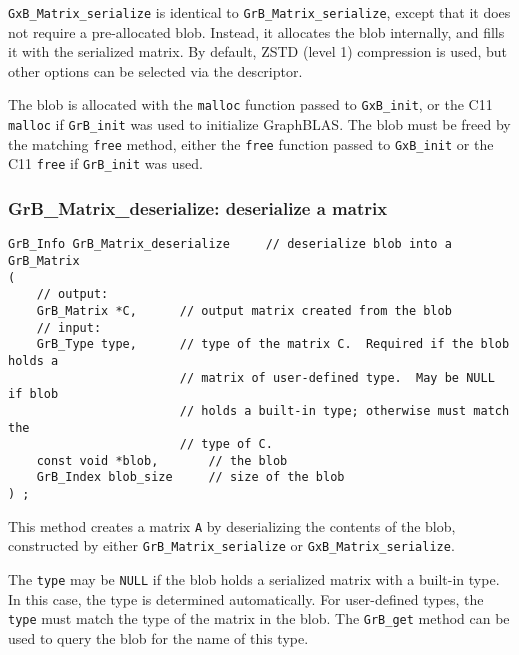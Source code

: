 \documentclass[12pt]{article}
\begin{document}
\verb'GxB_Matrix_serialize' is identical to \verb'GrB_Matrix_serialize', except
that it does not require a pre-allocated blob.  Instead, it allocates the blob
internally, and fills it with the serialized matrix.  By default, ZSTD (level 1)
compression is used, but other options can be selected via the descriptor.

The blob is allocated with the \verb'malloc' function passed to
\verb'GxB_init', or the C11 \verb'malloc' if \verb'GrB_init' was used
to initialize GraphBLAS.  The blob must be freed by the matching \verb'free'
method, either the \verb'free' function passed to \verb'GxB_init' or
the C11 \verb'free' if \verb'GrB_init' was used.

\newpage
\subsubsection{{\sf GrB\_Matrix\_deserialize:}    deserialize a matrix}
\label{matrix_deserialize}

\begin{mdframed}[userdefinedwidth=6in]
{\footnotesize
\begin{verbatim}
GrB_Info GrB_Matrix_deserialize     // deserialize blob into a GrB_Matrix
(
    // output:
    GrB_Matrix *C,      // output matrix created from the blob
    // input:
    GrB_Type type,      // type of the matrix C.  Required if the blob holds a
                        // matrix of user-defined type.  May be NULL if blob
                        // holds a built-in type; otherwise must match the
                        // type of C.
    const void *blob,       // the blob
    GrB_Index blob_size     // size of the blob
) ;
\end{verbatim}
} \end{mdframed}

This method creates a matrix \verb'A' by deserializing the contents of the
blob, constructed by either \verb'GrB_Matrix_serialize' or
\verb'GxB_Matrix_serialize'.

The \verb'type' may be \verb'NULL' if the blob holds a serialized matrix with a
built-in type.  In this case, the type is determined automatically.  For
user-defined types, the \verb'type' must match the type of the matrix in the
blob.  The \verb'GrB_get' method can be used to query the blob for the name of
this type.
\end{document}

